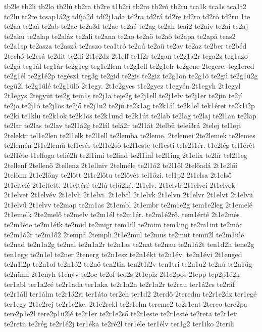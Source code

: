 {tb2le
tb2li
tb2lo
tb2lú
tb2ra
tb2re
t1b2ri
tb2ro
tb2ró
tb2ru
tca1k
tca1s
tca1t2
tc2lu
tc2re
tcsap1á2g
tdíja2d
tdí2j1ada
td2ra
td2rá
td2re
td2ro
td2ró
td2ru
1te
te2aa
te2aá
te2ab
te2ac
te2a3d
te2ae
te2aé
te2ag
te2ah
teai2
te2aiv
te2aí
te2aj
te2aku
te2alap
te2aláz
te2ali
te2ana
te2ao
te2aö
te2aő
te2apa
te2apá
teas2
te2a1sp
te2asza
te2aszá
te2aszo
tea1tró
te2aú
te2aü
te2av
te2az
te2ber
te2béd
2techó
te2csá
te2dit
te2dí
2t1e2dz
2t1eff
te1f2r
te2gan
te2g1a2r
tega2z
teg1azo
te2gá
teg1ál
teg1ár
te2g1eg
teg1e2lem
te2g1ell
te2g1elr
te2gene
2tegere.
teg1ered
te2g1él
te2g1é2p
tegész1
teg3g
te2gid
te2gis
te2giz
te2g1on
te2g1ö
te2gú
te2g1ü2g
tegü2l
te2g1ülé
te2g1ülő
2t1egy.
2t1e2gyes
t1e2gyez
t1egyén
2t1egyh
2t1egyl
2t1egys
2tegyüt
tei2g
tein1s
te2j1a
teje2g
te2j1ell
te2j1elv
te2j1er
te2jin
te2jí
te2jo
te2j1ó
te2j1ös
te2jő
te2j1u2
te2jú
te2k1ag
te2k1ál
te2k1el
tek1éret
te2k1i2p
te2kí
te1klu
te2k1ok
te2k1ös
te2k1und
te2k1út
te2lab
te2lag
te2laj
te2l1an
te2lap
te2lar
te2las
te2lav
te2l1á2g
te2lál
telá2r
te2l1át
2telbü
teleí3rá
2telej
tel1ejt
2telektr
tel1e2len
te2l1elk
te2l1ell
te2lemba
te2leme.
2telemei
2te2lemek
te2lemes
te2lemén
2t1e2lemű
tel1esés
te2l1e2ső
te2l1este
tel1esti
tele2t1ér.
t1e2lég
tel1érét
te2l1éte
t1elfoga
telié2h
te2l1imi
te2lind
te2l1inf
te2l1ing
2t1elix
te2lír
tel2l1eg
2tellenf
2tellenő
2tellenz
2t1ellniv
2telméle
te2l1ó2
te2l1öl
2telőadá
2t1e2lőí
2telőnn
2t1e2lőny
te2lőtt
2t1e2lőtu
te2lővét
tel1őzi.
tel1p2
2t1elsa
2t1első
2t1eltelé
2t1eltett.
2t1eltéré
te2lú
telü2ké.
2t1elv.
2t1elvb
2t1elvei
2t1elvek
2t1elvet
2t1elvév
2t1elvh
2t1elvi.
2t1elvil
2t1elvk
2t1elvn
2t1elvr
2t1elvt
2t1elvü
2t1elvű
2t1elvv
te2map
te2m1as
2t1embl
2t1embr
te2m1e2g
tem1e2leg
2t1emelé
2t1emelk
2te2melő
te2melv
te2m1él
te2m1ér.
te2m1é2rő.
tem1érté
2t1e2més
te2m1éte
te2m1étk
te2mid
te2migr
tem1ill
te2mim
tem1ing
te2m1int
te2móc
te2m1ó2r
te2m1ő2
2tempá
2templi
2t1e2mul
te2mus
te2mut
temü2l
te2m1ülé
te2nad
te2n1a2g
te2nal
te2n1a2r
te2n1as
te2nat
te2nau
te2n1á2t
ten1d2h
tene2g
ten1egy
te2n1el
te2ner
2tenerg
te2n1esz
te2n1ékt
te2n1év.
te2n1évi
2t1enged
te2n1i2p
te2n1ol
te2n1ó2
te2nö
ten2tin
ten2t1í2v
ten1tri
te2n1u2
te2nú
te2n1üg
te2nünn
2t1enyh
t1enyv
te2oc
te2of
teo2s
2t1epiz
2t1e2pos
2tepp
tep2p1é2k
ter1abl
ter1a2cé
te2r1ada
ter1aka
te2r1a2n
te2r1a2r
te2rau
ter1á2cs
te2ráf
te2r1áll
ter1álm
te2r1á2ri
ter1áta
ter2ch
ter1d2
2terdő
2teredm
te2r1e2dz
ter1egé
ter1egy
2t1e2rej
te2r1e2ke.
2t1e2rekl
te2r1elm
tereme2
te2r1ent
2tereo
tere2pa
tere2p1e2l
tere2p1ü2lé
te2r1er
te2r1e2ső
te2r1este
te2r1esté
te2reta
te2r1eti
te2retn
te2rég
te2r1é2j
ter1éka
te2ré2l
ter1éle
ter1élv
ter1g2
ter1iko
2terili
}
